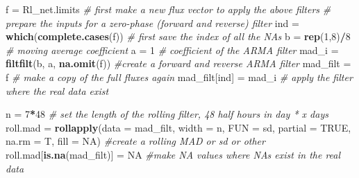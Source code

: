 \documentclass[
]{article}
\newenvironment{Shaded}{\begin{snugshade}}{\end{snugshade}}
\newcommand{\AttributeTok}[1]{\textcolor[rgb]{0.13,0.29,0.53}{#1}}
\newcommand{\CommentTok}[1]{\textcolor[rgb]{0.56,0.35,0.01}{\textit{#1}}}
\newcommand{\ConstantTok}[1]{\textcolor[rgb]{0.56,0.35,0.01}{#1}}
\newcommand{\DecValTok}[1]{\textcolor[rgb]{0.00,0.00,0.81}{#1}}
\newcommand{\FunctionTok}[1]{\textcolor[rgb]{0.13,0.29,0.53}{\textbf{#1}}}
\newcommand{\NormalTok}[1]{#1}
\newcommand{\OtherTok}[1]{\textcolor[rgb]{0.56,0.35,0.01}{#1}}
\newcommand{\SpecialCharTok}[1]{\textcolor[rgb]{0.81,0.36,0.00}{\textbf{#1}}}
\begin{document}
\begin{Shaded}
\begin{Highlighting}[]
\NormalTok{f }\OtherTok{=}\NormalTok{ Rl\_net.limits }\CommentTok{\# first make a new flux vector to apply the above filters}
\CommentTok{\# prepare the inputs for a zero{-}phase (forward and reverse) filter  }
\NormalTok{ind       }\OtherTok{=} \FunctionTok{which}\NormalTok{(}\FunctionTok{complete.cases}\NormalTok{(f))   }\CommentTok{\# first save the index of all the NAs}
\NormalTok{b         }\OtherTok{=} \FunctionTok{rep}\NormalTok{(}\DecValTok{1}\NormalTok{,}\DecValTok{8}\NormalTok{)}\SpecialCharTok{/}\DecValTok{8}                 \CommentTok{\# moving average coefficient}
\NormalTok{a         }\OtherTok{=} \DecValTok{1}                          \CommentTok{\# coefficient of the ARMA filter}
\NormalTok{mad\_i    }\OtherTok{=} \FunctionTok{filtfilt}\NormalTok{(b, a, }\FunctionTok{na.omit}\NormalTok{(f)) }\CommentTok{\#create a forward and reverse ARMA filter}
\NormalTok{mad\_filt }\OtherTok{=}\NormalTok{ f                          }\CommentTok{\# make a copy of the full fluxes again}
\NormalTok{mad\_filt[ind] }\OtherTok{=}\NormalTok{ mad\_i                }\CommentTok{\# apply the filter where the real data exist}

\NormalTok{n }\OtherTok{=} \DecValTok{7}\SpecialCharTok{*}\DecValTok{48} \CommentTok{\# set the length of the rolling filter, 48 half hours in day * x days}
\NormalTok{roll.mad }\OtherTok{=} \FunctionTok{rollapply}\NormalTok{(}\AttributeTok{data =}\NormalTok{ mad\_filt,}
                     \AttributeTok{width =}\NormalTok{ n,}
                     \AttributeTok{FUN =}\NormalTok{ sd,}
                     \AttributeTok{partial =} \ConstantTok{TRUE}\NormalTok{,}
                     \AttributeTok{na.rm =}\NormalTok{ T,}
                     \AttributeTok{fill =} \ConstantTok{NA}\NormalTok{)  }\CommentTok{\#create a rolling MAD or sd or other}
\NormalTok{roll.mad[}\FunctionTok{is.na}\NormalTok{(mad\_filt)] }\OtherTok{=} \ConstantTok{NA}  \CommentTok{\#make NA values where NAs exist in the real data}


\end{Highlighting}
\end{Shaded}
\end{document}
